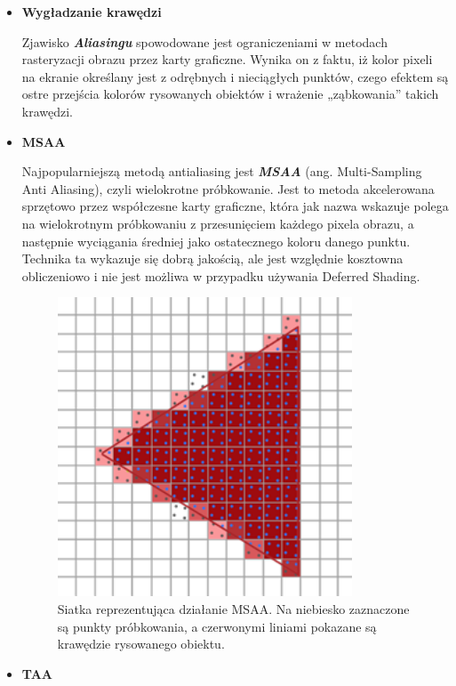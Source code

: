 \begin{itemize}
	\item \textbf{Wygładzanie krawędzi}

	Zjawisko \emph{\textbf{Aliasingu}} spowodowane jest ograniczeniami w metodach rasteryzacji obrazu przez karty graficzne. Wynika on z faktu, iż kolor pixeli na ekranie określany jest z odrębnych i nieciągłych punktów, czego efektem są ostre przejścia kolorów rysowanych obiektów i wrażenie „ząbkowania'' takich krawędzi.
	
	\item \textbf{MSAA}
	
	Najpopularniejszą metodą antialiasing jest \emph{\textbf{MSAA}} (ang. Multi-Sampling Anti Aliasing), czyli wielokrotne próbkowanie. Jest to metoda akcelerowana sprzętowo przez współczesne karty graficzne, która jak nazwa wskazuje polega na wielokrotnym próbkowaniu z przesunięciem każdego pixela obrazu, a następnie wyciągania średniej jako ostatecznego koloru danego punktu. Technika ta wykazuje się dobrą jakością, ale jest względnie kosztowna obliczeniowo i nie jest możliwa w przypadku używania Deferred Shading.
	
	\begin{figure}[htbp]
		\centering
		\includegraphics[width=3.4483in,height=3.5in]{images/9_MSAA_grid.png}
		\caption{Siatka reprezentująca działanie MSAA. Na niebiesko zaznaczone są punkty próbkowania, a czerwonymi liniami pokazane są krawędzie rysowanego obiektu. \cite{learnopengl:antialiasing:2024}}
	\end{figure}

	\item \textbf{TAA}
	

\end{itemize}
